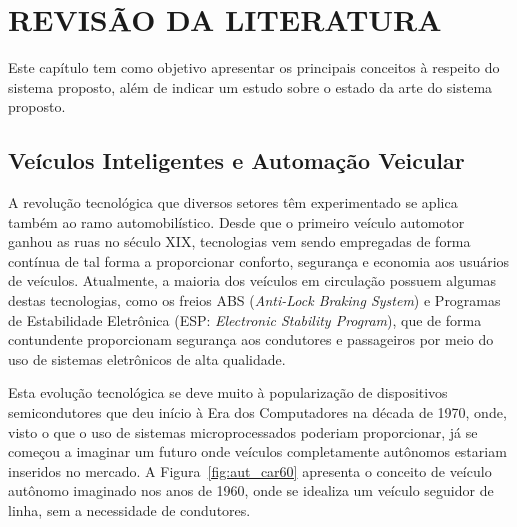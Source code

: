 \chapter{REVISÃO DA LITERATURA}
\label{cap:revisao}

Este capítulo tem como objetivo apresentar os principais conceitos à respeito do sistema proposto, além de indicar um estudo sobre o estado da arte do sistema proposto.

\section{Veículos Inteligentes e Automação Veicular}

A revolução tecnológica que diversos setores têm experimentado se aplica também ao ramo automobilístico. Desde que o primeiro veículo automotor ganhou as ruas no século XIX, tecnologias vem sendo empregadas de forma contínua de tal forma a proporcionar conforto, segurança e economia aos usuários de veículos. Atualmente, a maioria dos veículos em circulação possuem algumas destas tecnologias, como os freios ABS (\textit{Anti-Lock Braking System}) e Programas de Estabilidade Eletrônica (ESP: \textit{Electronic Stability Program}), que de forma contundente proporcionam segurança aos condutores e passageiros por meio do uso de sistemas eletrônicos de alta qualidade.

Esta evolução tecnológica se deve muito à popularização de dispositivos semicondutores que deu início à Era dos Computadores na década de 1970, onde, visto o que o uso de sistemas microprocessados poderiam proporcionar, já se começou a imaginar um futuro onde veículos completamente autônomos estariam inseridos no mercado. A Figura~\ref{fig:aut_car60} apresenta o conceito de veículo autônomo imaginado nos anos de 1960, onde se idealiza um veículo seguidor de linha, sem a necessidade de condutores.

